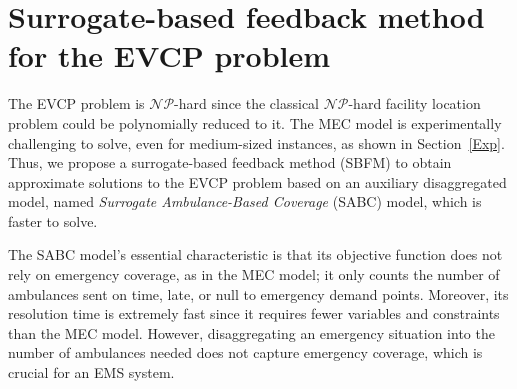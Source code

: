 \section{Surrogate-based feedback method for the EVCP problem} \label{IF}


The EVCP problem is $\mathcal{NP}$-hard since the classical $\mathcal{NP}$-hard facility location problem \citep{megiddo1982complexity} could be polynomially reduced to it. The MEC model is experimentally challenging to solve, even for medium-sized instances, as shown in Section~\ref{Exp}. Thus, we propose a surrogate-based feedback method (SBFM) to obtain approximate solutions to the EVCP problem based on an auxiliary disaggregated model, named \textit{Surrogate Ambulance-Based Coverage} (SABC) model, which is faster to solve. 

The SABC model's essential characteristic is that its objective function does not rely on emergency coverage, as in the MEC model; it only counts the number of ambulances sent on time, late, or null to emergency demand points. Moreover, its resolution time is extremely fast since it requires fewer variables and constraints than the MEC model. However, disaggregating an emergency situation into the number of ambulances needed does not capture emergency coverage, which is crucial for an EMS system.

